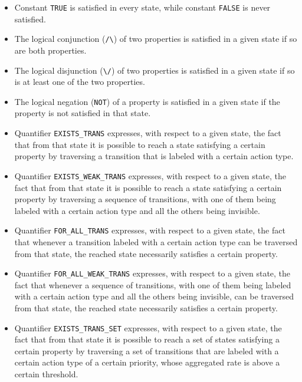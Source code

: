         \begin{itemize}

\item Constant {\tt TRUE} is satisfied in every state, while constant {\tt FALSE} is never satisfied.

\item The logical conjunction (\verb+/\+) of two properties is satisfied in a given state if so are both
properties.

\item The logical disjunction (\verb+\/+) of two properties is satisfied in a given state if so is at least
one of the two properties.

\item The logical negation ({\tt NOT}) of a property is satisfied in a given state if the property is not
satisfied in that state.

\item Quantifier {\tt EXISTS\_TRANS} expresses, with respect to a given state, the fact that from that state
it is possible to reach a state satisfying a certain property by traversing a transition that is labeled
with a certain action type.

\item Quantifier {\tt EXISTS\_WEAK\_TRANS} expresses, with respect to a given state, the fact that from that
state it is possible to reach a state satisfying a certain property by traversing a sequence of transitions,
with one of them being labeled with a certain action type and all the others being invisible.

\item Quantifier {\tt FOR\_ALL\_TRANS} expresses, with respect to a given state, the fact that whenever a
transition labeled with a certain action type can be traversed from that state, the reached state
necessarily satisfies a certain property.

\item Quantifier {\tt FOR\_ALL\_WEAK\_TRANS} expresses, with respect to a given state, the fact that
whenever a sequence of transitions, with one of them being labeled with a certain action type and all the
others being invisible, can be traversed from that state, the reached state necessarily satisfies a certain
property.

\item Quantifier {\tt EXISTS\_TRANS\_SET} expresses, with respect to a given state, the fact that from that
state it is possible to reach a set of states satisfying a certain property by traversing a set of
transitions that are labeled with a certain action type of a certain priority, whose aggregated rate is
above a certain threshold.


\end{itemize}
